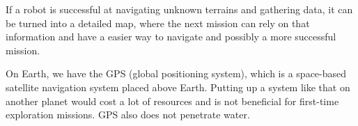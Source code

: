 If a robot is successful at navigating unknown terrains and gathering data, it can be turned into a detailed map, where the next mission can rely on that information and have a easier way to navigate and possibly a more successful mission. 

On Earth, we have the GPS (global positioning system), which is a space-based satellite navigation system placed above Earth\cite{gpsgeneral}. Putting up a system like that on another planet would cost a lot of resources and is not beneficial for first-time exploration missions. GPS also does not penetrate water\cite{underwatergps}. 
